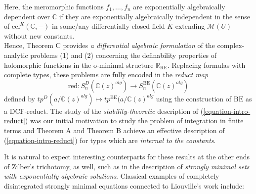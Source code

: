 \documentclass[12pt]{amsart}
\newcommand{\DCF}{\mathrm{DCF}}
\newcommand{\BE}{\mathrm{BE}}
\theoremstyle{definition}
\theoremstyle{plain}
\theoremstyle{exampstyle}\newtheorem{thmx}{Theorem}
\theoremstyle{exampstyle}\newtheorem{thmxbis}{Theorem}
\begin{document}
Here, the meromorphic functions $f_1,\ldots,f_n$ are exponentially algebraically dependent over $\mathbb{C}$ if they are exponentially algebraically independent in the sense of $\mathrm{ecl}^K(\mathbb{C},-)$ in some/any differentially closed field $K$ extending $\mathcal M(U)$ without new constants. \\

Hence, Theorem C provides {\em a differential algebraic formulation} of the complex-analytic problems (1) and (2) concerning the definability properties of holomorphic functions in the o-minimal structure $\mathbb{R}_{\mathrm{RE}}$. Replacing formulas with complete types, these problems are fully encoded in the {\em reduct map}
\begin{equation}\label{equation-intro-reduct} 
\mathrm{red}: S_n^D(\mathbb{C}(z)^{alg}) \rightarrow S_n^\BE(\mathbb{C}(z)^{alg})
\end{equation}
defined by $tp^D(a/\mathbb{C}(z)^{alg}) \mapsto tp^{\BE}(a/\mathbb{C}(z)^{alg}$ using the construction of $\BE$ as a $\DCF$-reduct. The study of the {\em stability-theoretic} description of (\ref{equation-intro-reduct}) was our initial motivation to study the problem of integration in finite terms and Theorem A and Theorem B achieve an effective description of (\ref{equation-intro-reduct}) for types which are {\em internal to the constants}. 

It is natural to expect interesting counterparts for these results at the other ends of Zilber's trichotomy, as well, such as in the description of {\em strongly minimal sets with exponentially algebraic solutions}.  Classical examples of completely disintegrated strongly minimal equations connected to Liouville's work include:
\end{document}
